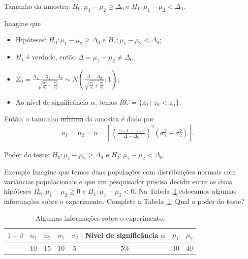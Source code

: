 \documentclass[9pt]{beamer}
\begin{document}
\begin{frame}{Tamanho da amostra: $H_0:\mu_1 - \mu_2 \geq \Delta_0$ e $H_1: \mu_1 - \mu_2 < \Delta_0$.}

\large

Imagine que
\begin{itemize}
\item Hipóteses: $H_0: \mu_1 - \mu_2 \geq \Delta_0$ e $H_1: \mu_1 -  \mu_2 < \Delta_0$;
\item $H_1$ é verdade, então $\Delta = \mu_1-\mu_2 \neq \Delta_0$;
\item $Z_0 = \frac{\bar{X}_1 - \bar{X}_2 - \Delta_0}{ \sqrt{ \frac{\sigma_1^2}{n_1} + \frac{\sigma_2^2}{n_2} } } \sim N\left( \frac{\Delta - \Delta_0}{ \sqrt{ \frac{\sigma_1^2}{n_1} + \frac{\sigma_2^2}{n_2} } } ; 1\right)$;
\item Ao nível de significância $\alpha$, temos $RC = \{ z_0 \mid z_0 < z_\alpha  \}$.
\end{itemize}
\vfill


Então, o tamanho \sout{mínimo} da amostra é dado por
\begin{align*}
n_1 = n_2 = n = \left\lceil \left( \frac{z_{1-\beta} + z_{1-\alpha}}{\Delta - \Delta_0} \right)^2 (\sigma_1^2 + \sigma_2^2) \right\rceil.
\end{align*}

\normalsize

\end{frame}

\begin{frame}{Poder do teste: $H_0:\mu_1 - \mu_2 \geq \Delta_0$ e $H_1: \mu_1 - \mu_2 < \Delta_0$.}

\Large

\begin{block}{Exemplo}
Imagine que temos duas populações com distribuições normais com variâncias populacionais e que um pesquisador precisa decidir entre as duas hipóteses $H_0: \mu_1 - \mu_2 \geq 0$ e $H_1: \mu_1 - \mu_2 < 0$. Na Tabela~\ref{tab:comparacao-medias-power} colocamos algumas informações sobre o experimento. Complete a Tabela~\ref{tab:comparacao-medias-power}. Qual o poder do teste?
\begin{table}[htbp]
\centering
\begin{tabular}{c|c|c|c|c|c|c|c}
	\toprule[0.05cm]
	$1-\beta$ & $n_1$ & $n_2$ & 	 $\sigma_1$ & $\sigma_2$ & Nível de significância $\alpha$ & $\mu_1$ & $\mu_2$\\  \midrule[0.025cm]
	 & 10 & 15 & 	 $10$ & $5$ & $5\%$ & $30$ & $40$\\ \bottomrule[0.05cm] 
\end{tabular}
\caption{Algumas informações sobre o experimento.}
\label{tab:comparacao-medias-power}
\end{table}	
\end{block}

\normalsize
\end{frame}
\end{document}
